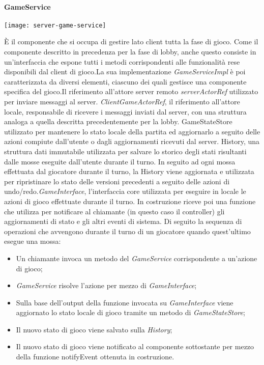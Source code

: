\paragraph{GameService}
\begin{center}
    \texttt{[image: server-game-service]}
\end{center}
È il componente che si occupa di gestire lato client tutta la fase di gioco.
Come il componente descritto in precedenza per la fase di lobby, anche questo consiste in un’interfaccia che espone tutti i metodi corrispondenti alle funzionalità rese disponibili dal client di gioco.\newline La sua implementazione \textit{GameServiceImpl} è poi caratterizzata da diversi elementi, ciascuno dei quali gestisce una componente specifica del gioco.\newline Il riferimento all’attore server remoto \textit{serverActorRef} utilizzato per inviare messaggi al server. \textit{ClientGameActorRef}, il riferimento all’attore locale, responsabile di ricevere i messaggi inviati dal server, con una struttura analoga a quella descritta precedentemente per la lobby.
\newline GameStateStore utilizzato per mantenere lo stato locale della partita ed aggiornarlo a seguito delle azioni compiute dall’utente o dagli aggiornamenti ricevuti dal server. History, una struttura dati immutabile utilizzata per salvare lo storico degli stati risultanti dalle mosse eseguite dall’utente durante il turno. In seguito ad ogni mossa effettuata dal giocatore durante il turno, la History viene aggiornata e utilizzata per ripristinare lo stato delle versioni precedenti a seguito delle azioni di undo/redo.\newline \textit{GameInterface}, l’interfaccia core utilizzata per eseguire in locale le azioni di gioco effettuate durante il turno. \newline In costruzione riceve poi una funzione che utilizza per notificare al chiamante (in questo caso il controller) gli aggiornamenti di stato e gli altri eventi di sistema.
\newline
\newline
Di seguito la sequenza di operazioni che avvengono durante il turno di un giocatore quando quest’ultimo esegue una mossa:
\begin{itemize}
    \item Un chiamante invoca un metodo del \textit{GameService} corrispondente a un’azione di gioco;
    \item \textit{GameService} risolve l’azione per mezzo di \textit{GameInterface};
    \item Sulla base dell’output della funzione invocata su \textit{GameInterface} viene aggiornato lo stato locale di gioco tramite un metodo di \textit{GameStateStore};
    \item Il nuovo stato di gioco viene salvato sulla \textit{History};
    \item Il nuovo stato di gioco viene notificato al componente sottostante per mezzo della funzione notifyEvent ottenuta in costruzione.
\end{itemize}
